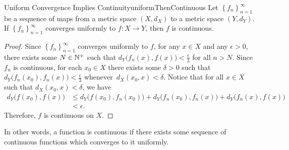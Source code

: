 \documentclass[math]{amznotes}
\theoremstyle{remark}
\begin{document}
\begin{probox}{Uniform Convergence Implies Continuity}{uniformThenContinuous}
    Let $\left\{f_n\right\}_{n = 1}^{\infty}$ be a sequence of maps from a metric space $\left(X, d_X\right)$ to a metric space $\left(Y, d_Y\right)$. If $\left\{f_n\right\}_{n = 1}^{\infty}$ converges uniformly to $f \colon X \to Y$, then $f$ is continuous.
    \tcblower
    \begin{proof}
        Since $\left\{f_n\right\}_{n = 1}^{\infty}$ converges uniformly to $f$, for any $x \in X$ and any $\epsilon > 0$, there exists some $N \in \mathbb{N}^+$ such that $d_Y\bigl(f_n\left(x\right), f\left(x\right)\bigr) < \frac{\epsilon}{3}$ for all $n > N$. Since $f_n$ is continuous, for each $x_0 \in X$ there exists some $\delta > 0$ such that $d_Y\bigl(f_n\left(x_0\right), f_n\left(x\right)\bigr) < \frac{\epsilon}{3}$ whenever~$d_X\left(x_0, x\right) < \delta$. Notice that for all $x \in X$ such that $d_X\left(x_0, x\right) < \delta$, we have 
        \begin{align*}
            d_Y\bigl(f\left(x_0\right), f\left(x\right)\bigr) & \leq d_Y\bigl(f\left(x_0\right), f_n\left(x_0\right)\bigr)  + d_Y\bigl(f_n\left(x_0\right), f_n\left(x\right)\bigr) + d_Y\bigl(f_n\left(x\right), f\left(x\right)\bigr) \\
            & < \epsilon.
        \end{align*}
        Therefore, $f$ is continuous on $X$.
    \end{proof}
\end{probox}
In other words, a function is continuous if there exists some sequence of continuous functions which converges to it uniformly.
\end{document}
